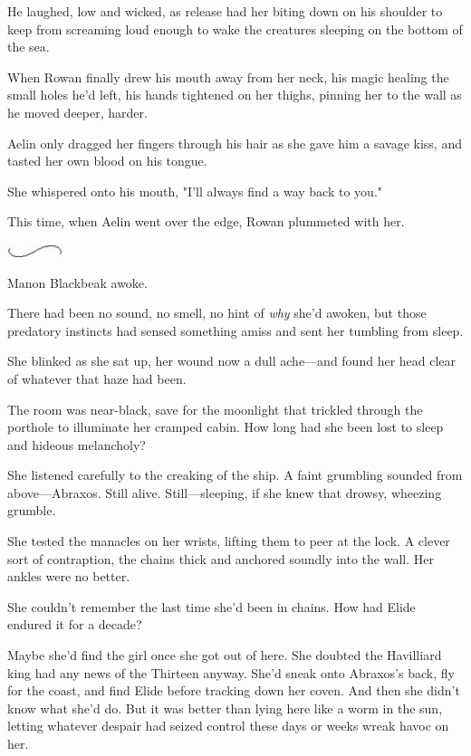He laughed, low and wicked, as release had her biting down on his shoulder to keep from screaming loud enough to wake the creatures sleeping on the bottom of the sea.

When Rowan finally drew his mouth away from her neck, his magic healing the small holes he'd left, his hands tightened on her thighs, pinning her to the wall as he moved deeper, harder.

Aelin only dragged her fingers through his hair as she gave him a savage kiss, and tasted her own blood on his tongue.

She whispered onto his mouth, "I'll always find a way back to you."

This time, when Aelin went over the edge, Rowan plummeted with her.

\includegraphics[width=0.65in,height=0.13in]{images/seperator}

Manon Blackbeak awoke.

There had been no sound, no smell, no hint of \emph{why} she'd awoken, but those predatory instincts had sensed something amiss and sent her tumbling from sleep.

She blinked as she sat up, her wound now a dull ache---and found her head clear of whatever that haze had been.

The room was near-black, save for the moonlight that trickled through the porthole to illuminate her cramped cabin. How long had she been lost to sleep and hideous melancholy?

She listened carefully to the creaking of the ship. A faint grumbling sounded from above---Abraxos. Still alive. Still---sleeping, if she knew that drowsy, wheezing grumble.

She tested the manacles on her wrists, lifting them to peer at the lock. A clever sort of contraption, the chains thick and anchored soundly into the wall. Her ankles were no better.

She couldn't remember the last time she'd been in chains. How had Elide endured it for a decade?

Maybe she'd find the girl once she got out of here. She doubted the Havilliard king had any news of the Thirteen anyway. She'd sneak onto Abraxos's back, fly for the coast, and find Elide before tracking down her coven. And then  she didn't know what she'd do. But it was better than lying here like a worm in the sun, letting whatever despair had seized control these days or weeks wreak havoc on her.

